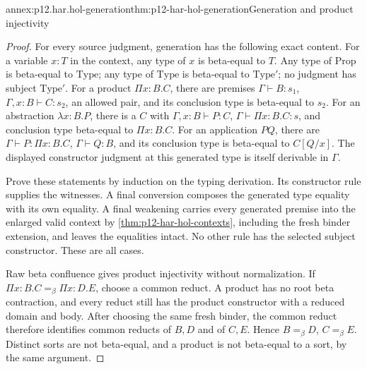 \begin{annexitem}{annex:p12.har.hol-generation}{thm:p12-har-hol-generation}{Generation and product injectivity}
\begin{proof}
For every source judgment, generation has the following exact content.
For a variable \(x:T\) in the context, any type of \(x\) is
beta-equal to \(T\). Any type of \(\mathrm{Prop}\) is beta-equal to
\(\mathrm{Type}\); any type of \(\mathrm{Type}\) is beta-equal to
\(\mathrm{Type}'\); no judgment has subject \(\mathrm{Type}'\).
For a product \(\Pi x:B.C\), there are premises
\(\Gamma\vdash B:s_1\),
\(\Gamma,x:B\vdash C:s_2\), an allowed pair, and its conclusion type
is beta-equal to \(s_2\). For an abstraction \(\lambda x:B.P\),
there is a \(C\) with \(\Gamma,x:B\vdash P:C\),
\(\Gamma\vdash\Pi x:B.C:s\), and conclusion type beta-equal to
\(\Pi x:B.C\). For an application \(PQ\), there are
\(\Gamma\vdash P:\Pi x:B.C\), \(\Gamma\vdash Q:B\), and its
conclusion type is beta-equal to \(C[Q/x]\).
The displayed constructor judgment at this generated type is itself
derivable in \(\Gamma\).

Prove these statements by induction on the typing derivation. Its
constructor rule supplies the witnesses. A final conversion composes
the generated type equality with its own equality. A final weakening
carries every generated premise into the enlarged valid context by \cref{thm:p12-har-hol-contexts},
including the fresh binder extension, and leaves the equalities intact.
No other rule has the selected subject constructor. These are all cases.

Raw beta confluence gives product injectivity without normalization.
If \(\Pi x:B.C=_\beta\Pi x:D.E\), choose a common reduct.
A product has no root beta contraction, and every reduct still has
the product constructor with a reduced domain and body. After choosing
the same fresh binder, the common reduct therefore identifies common
reducts of \(B,D\) and of \(C,E\). Hence
\(B=_\beta D\), \(C=_\beta E\). Distinct sorts are not beta-equal,
and a product is not beta-equal to a sort, by the same argument.
\end{proof}
\end{annexitem}

